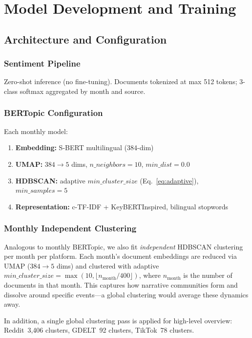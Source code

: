 \documentclass[12pt, a4paper]{article}
\begin{document}
\section{Model Development and Training}
\label{sec:training}

\subsection{Architecture and Configuration}

\subsubsection{Sentiment Pipeline}
Zero-shot inference (no fine-tuning). Documents tokenized at max 512 tokens; 3-class softmax aggregated by month and source.

\subsubsection{BERTopic Configuration}
Each monthly model:
\begin{enumerate}[leftmargin=*, nosep]
  \item \textbf{Embedding:} S-BERT multilingual (384-dim)
  \item \textbf{UMAP:} $384 \to 5$ dims, $n\_neighbors\!=\!10$, $min\_dist\!=\!0.0$
  \item \textbf{HDBSCAN:} adaptive $min\_cluster\_size$ (Eq.~\ref{eq:adaptive}), $min\_samples\!=\!5$
  \item \textbf{Representation:} c-TF-IDF + KeyBERTInspired, bilingual stopwords
\end{enumerate}

\subsubsection{Monthly Independent Clustering}
Analogous to monthly BERTopic, we also fit \emph{independent} HDBSCAN clustering per month per platform. Each month's document embeddings are reduced via UMAP ($384 \to 5$ dims) and clustered with adaptive $min\_cluster\_size = \max(10, \lfloor n_{\text{month}} / 400 \rfloor)$, where $n_{\text{month}}$ is the number of documents in that month. This captures how narrative communities form and dissolve around specific events---a global clustering would average these dynamics away.

In addition, a single global clustering pass is applied for high-level overview: Reddit~3,406 clusters, GDELT~92 clusters, TikTok~78 clusters.
\end{document}
